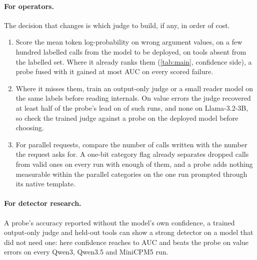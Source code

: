 \paragraph{For operators.}
The decision that changes is which judge to build, if any, in order of cost.

\begin{tcolorbox}[colback=white,colframe=black!60,boxrule=0.5pt,arc=1pt,left=4pt,right=4pt,top=3pt,bottom=3pt,title=\small Before building an internal judge for a tool-calling model]
\small
\begin{enumerate}[topsep=0pt,itemsep=1pt,leftmargin=1.2em]
\item Score the mean token log-probability on wrong argument values, on a few hundred labelled calls from the model to be deployed, on tools absent from the labelled set. Where it already ranks them (\cref{tab:main}, confidence side), a probe fused with it gained at most \fusConfMaxConfidence{} AUC on every scored failure.
\item Where it misses them, train an output-only judge or a small reader model on the same labels before reading internals. On value errors the judge recovered at least half of the probe's lead on \nJwShareMajority{} of \nJwEligible{} such runs, and none on Llama-3.2-3B, so check the trained judge against a probe on the deployed model before choosing.
\item For parallel requests, compare the number of calls written with the number the request asks for. A one-bit category flag already separates dropped calls from valid ones on every run with enough of them, and a probe adds nothing measurable within the parallel categories on the one run prompted through its native template.
\end{enumerate}
\end{tcolorbox}

\paragraph{For detector research.}
A probe's accuracy reported without the model's own confidence, a trained output-only judge and held-out tools can show a strong detector on a model that did not need one: here confidence reaches \confMinPowered{} to \confMaxPowered{} AUC and beats the probe on value errors on every Qwen3, Qwen3.5 and MiniCPM5 run.
